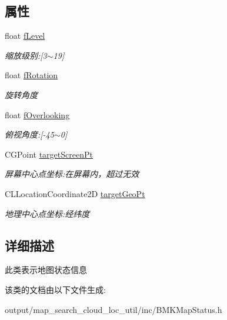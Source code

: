 \subsection*{属性}
\begin{DoxyCompactItemize}
\item 
\hypertarget{interface_b_m_k_map_status_abe3f9d36eee716ca15394aab89e1134c}{float \hyperlink{interface_b_m_k_map_status_abe3f9d36eee716ca15394aab89e1134c}{f\+Level}}\label{interface_b_m_k_map_status_abe3f9d36eee716ca15394aab89e1134c}

\begin{DoxyCompactList}\small\item\em 缩放级别\+:\mbox{[}3$\sim$19\mbox{]} \end{DoxyCompactList}\item 
\hypertarget{interface_b_m_k_map_status_a3c22c82aead710c2dec187ff1d39e370}{float \hyperlink{interface_b_m_k_map_status_a3c22c82aead710c2dec187ff1d39e370}{f\+Rotation}}\label{interface_b_m_k_map_status_a3c22c82aead710c2dec187ff1d39e370}

\begin{DoxyCompactList}\small\item\em 旋转角度 \end{DoxyCompactList}\item 
\hypertarget{interface_b_m_k_map_status_abd88f1cfbe5a8bbf2503c51802bf5c96}{float \hyperlink{interface_b_m_k_map_status_abd88f1cfbe5a8bbf2503c51802bf5c96}{f\+Overlooking}}\label{interface_b_m_k_map_status_abd88f1cfbe5a8bbf2503c51802bf5c96}

\begin{DoxyCompactList}\small\item\em 俯视角度\+:\mbox{[}-\/45$\sim$0\mbox{]} \end{DoxyCompactList}\item 
\hypertarget{interface_b_m_k_map_status_a902555f3b28504a2217443c496edc491}{C\+G\+Point \hyperlink{interface_b_m_k_map_status_a902555f3b28504a2217443c496edc491}{target\+Screen\+Pt}}\label{interface_b_m_k_map_status_a902555f3b28504a2217443c496edc491}

\begin{DoxyCompactList}\small\item\em 屏幕中心点坐标\+:在屏幕内，超过无效 \end{DoxyCompactList}\item 
\hypertarget{interface_b_m_k_map_status_a98d10950c91d08dce079020baafbe10d}{C\+L\+Location\+Coordinate2\+D \hyperlink{interface_b_m_k_map_status_a98d10950c91d08dce079020baafbe10d}{target\+Geo\+Pt}}\label{interface_b_m_k_map_status_a98d10950c91d08dce079020baafbe10d}

\begin{DoxyCompactList}\small\item\em 地理中心点坐标\+:经纬度 \end{DoxyCompactList}\end{DoxyCompactItemize}


\subsection{详细描述}
此类表示地图状态信息 

该类的文档由以下文件生成\+:\begin{DoxyCompactItemize}
\item 
output/map\+\_\+search\+\_\+cloud\+\_\+loc\+\_\+util/inc/B\+M\+K\+Map\+Status.\+h\end{DoxyCompactItemize}

